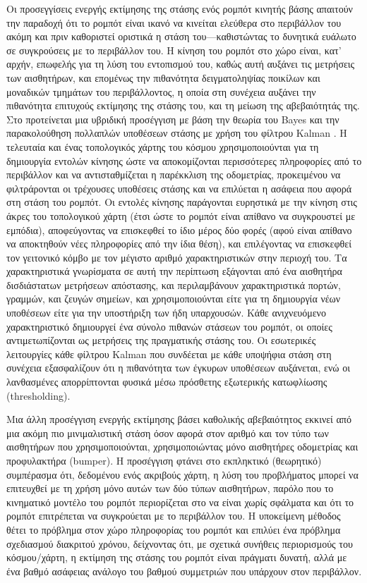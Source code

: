 Οι προσεγγίσεις ενεργής εκτίμησης της στάσης ενός ρομπότ κινητής βάσης απαιτούν
την παραδοχή ότι το ρομπότ είναι ικανό να κινείται ελεύθερα στο περιβάλλον του
ακόμη και πριν καθοριστεί οριστικά η στάση του---καθιστώντας το δυνητικά
ευάλωτο σε συγκρούσεις με το περιβάλλον του. Η κίνηση του ρομπότ στο χώρο
είναι, κατ' αρχήν, επωφελής για τη λύση του εντοπισμού του, καθώς αυτή αυξάνει
τις μετρήσεις των αισθητήρων, και επομένως την πιθανότητα δειγματοληψίας
ποικίλων και μοναδικών τμημάτων του περιβάλλοντος, η οποία στη συνέχεια αυξάνει
την πιθανότητα επιτυχούς εκτίμησης της στάσης του, και τη μείωση της
αβεβαιότητάς της. Στο \cite{Jensfelt2001a} προτείνεται μια υβριδική προσέγγιση
με βάση την θεωρία του Bayes \cite{thrun2005probabilistic} και την
παρακολούθηση πολλαπλών υποθέσεων στάσης με χρήση του φίλτρου Kalman
\cite{Maybeck1979}. Η τελευταία και ένας τοπολογικός χάρτης του κόσμου
χρησιμοποιούνται για τη δημιουργία εντολών κίνησης ώστε να αποκομίζονται
περισσότερες πληροφορίες από το περιβάλλον και να αντισταθμίζεται η παρέκκλιση
της οδομετρίας, προκειμένου να φιλτράρονται οι τρέχουσες υποθέσεις στάσης και
να επιλύεται η ασάφεια που αφορά στη στάση του ρομπότ. Οι εντολές κίνησης
παράγονται ευρηστικά με την κίνηση στις άκρες του τοπολογικού χάρτη (έτσι ώστε
το ρομπότ είναι απίθανο να συγκρουστεί με εμπόδια), αποφεύγοντας να επισκεφθεί
το ίδιο μέρος δύο φορές (αφού είναι απίθανο να αποκτηθούν νέες πληροφορίες από
την ίδια θέση), και επιλέγοντας να επισκεφθεί τον γειτονικό κόμβο με τον
μέγιστο αριθμό χαρακτηριστικών στην περιοχή του. Τα χαρακτηριστικά γνωρίσματα
σε αυτή την περίπτωση εξάγονται από ένα αισθητήρα δισδιάστατων μετρήσεων
απόστασης, και περιλαμβάνουν χαρακτηριστικά πορτών, γραμμών, και ζευγών
σημείων, και χρησιμοποιούνται είτε για τη δημιουργία νέων υποθέσεων είτε για
την υποστήριξη των ήδη υπαρχουσών.  Κάθε ανιχνευόμενο χαρακτηριστικό δημιουργεί
ένα σύνολο πιθανών στάσεων του ρομπότ, οι οποίες αντιμετωπίζονται ως μετρήσεις
της πραγματικής στάσης του.  Οι εσωτερικές λειτουργίες κάθε φίλτρου Kalman που
συνδέεται με κάθε υποψήφια στάση στη συνέχεια εξασφαλίζουν ότι η πιθανότητα των
έγκυρων υποθέσεων αυξάνεται, ενώ οι λανθασμένες απορρίπτονται φυσικά μέσω
πρόσθετης εξωτερικής κατωφλίωσης (thresholding).

Μια άλλη προσέγγιση ενεργής εκτίμησης βάσει καθολικής αβεβαιότητος \cite{OKane}
εκκινεί από μια ακόμη πιο μινιμαλιστική στάση όσον αφορά στον αριθμό και τον
τύπο των αισθητήρων που χρησιμοποιούνται, χρησιμοποιώντας μόνο αισθητήρες
οδομετρίας και προφυλακτήρα (bumper). Η προσέγγιση φτάνει στο εκπληκτικό
(θεωρητικό) συμπέρασμα ότι, δεδομένου ενός ακριβούς χάρτη, η λύση του
προβλήματος μπορεί να επιτευχθεί με τη χρήση μόνο αυτών των δύο τύπων
αισθητήρων, παρόλο που το κινηματικό μοντέλο του ρομπότ περιορίζεται στο να
είναι χωρίς σφάλματα και ότι το ρομπότ επιτρέπεται να συγκρούεται με το
περιβάλλον του. Η υποκείμενη μέθοδος θέτει το πρόβλημα στον χώρο πληροφορίας
του ρομπότ και επιλύει ένα πρόβλημα σχεδιασμού διακριτού χρόνου, δείχνοντας
ότι, με σχετικά συνήθεις περιορισμούς του κόσμου/χάρτη, η εκτίμηση της στάσης
του ρομπότ είναι πράγματι δυνατή, αλλά με ένα βαθμό ασάφειας ανάλογο του βαθμού
συμμετριών που υπάρχουν στον περιβάλλον.

